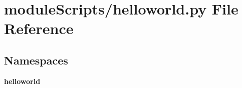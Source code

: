 \section{module\+Scripts/helloworld.py File Reference}
\label{helloworld_8py}
\subsection*{Namespaces}
\begin{DoxyCompactItemize}
\item 
 {\bf helloworld}
\end{DoxyCompactItemize}
